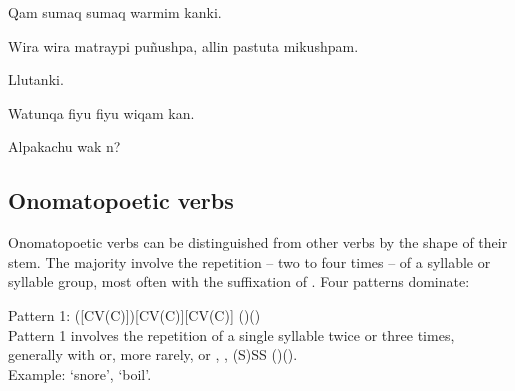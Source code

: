 %
{Qam sumaq sumaq warmim kanki.}%
{}%
{}{}%

%
{Wira wira matraypi pu\~nushpa, allin pastuta mikushpam.}%
{}%
{}{}%

%
{Llutanki.}%
{}%
{}{}%

%
{Watunqa fiyu fiyu wiqam kan.}%
{}%
{}{}%

%
{\textquestiondown{}Alpakachu wak n?}%
{}%
{}{}%

\vfill
\subsection{Onomatopoetic verbs}\label{sec:onomatopoeicverbs}
Onomatopoetic verbs can be distinguished from other verbs by the shape of their stem. The majority involve the repetition -- two to four times -- of a syllable or syllable group, most often with the suffixation of . Four patterns dominate:

\vfill
\noindent
Pattern 1: ([CV(C)])[CV(C)][CV(C)] ()()\\[1ex]
Pattern 1 involves the repetition of a single syllable twice or three times, generally with  or, more rarely,  or , \ie{}, (S)SS ()().\\[1ex]
Example:  `snore',  `boil'.

